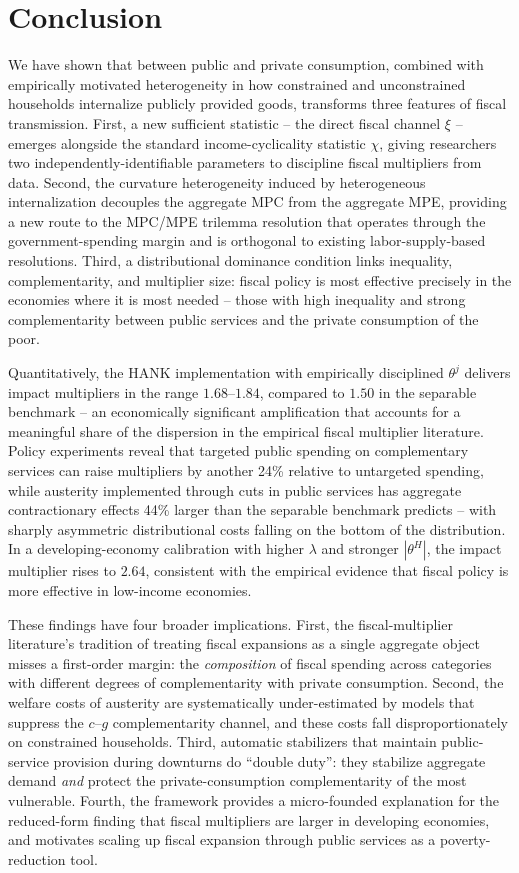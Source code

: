 \section{Conclusion}\label{sec:conclusion}

We have shown that \EC{} between public and private consumption, combined with
empirically motivated heterogeneity in how constrained and unconstrained
households internalize publicly provided goods, transforms three features of
fiscal transmission. First, a new sufficient statistic -- the direct fiscal
channel $\xi$ -- emerges alongside the standard income-cyclicality statistic
$\chi$, giving researchers two independently-identifiable parameters to
discipline fiscal multipliers from data. Second, the curvature heterogeneity
induced by heterogeneous internalization decouples the aggregate MPC from the
aggregate MPE, providing a new route to the MPC/MPE trilemma resolution that
operates through the government-spending margin and is orthogonal to existing
labor-supply-based resolutions. Third, a distributional dominance condition
links inequality, complementarity, and multiplier size: fiscal policy is most
effective precisely in the economies where it is most needed -- those with
high inequality and strong complementarity between public services and the
private consumption of the poor.

Quantitatively, the HANK implementation with empirically disciplined
$\theta^{j}$ delivers impact multipliers in the range $1.68$--$1.84$, compared
to $1.50$ in the separable benchmark -- an economically significant amplification
that accounts for a meaningful share of the dispersion in the empirical fiscal
multiplier literature. Policy experiments reveal that targeted public spending
on complementary services can raise multipliers by another 24\% relative to
untargeted spending, while austerity implemented through cuts in public
services has aggregate contractionary effects 44\% larger than the separable
benchmark predicts -- with sharply asymmetric distributional costs falling on
the bottom of the distribution. In a developing-economy calibration with
higher $\lambda$ and stronger $|\theta^{H}|$, the impact multiplier rises to
$2.64$, consistent with the empirical evidence that fiscal policy is more
effective in low-income economies.

These findings have four broader implications. First, the fiscal-multiplier
literature's tradition of treating fiscal expansions as a single aggregate
object misses a first-order margin: the \emph{composition} of fiscal spending
across categories with different degrees of complementarity with private
consumption. Second, the welfare costs of austerity are systematically
under-estimated by models that suppress the $c$--$g$ complementarity channel,
and these costs fall disproportionately on constrained households. Third,
automatic stabilizers that maintain public-service provision during downturns
do ``double duty'': they stabilize aggregate demand \emph{and} protect the
private-consumption complementarity of the most vulnerable. Fourth, the
framework provides a micro-founded explanation for the reduced-form finding
that fiscal multipliers are larger in developing economies, and motivates
scaling up fiscal expansion through public services as a poverty-reduction
tool.

